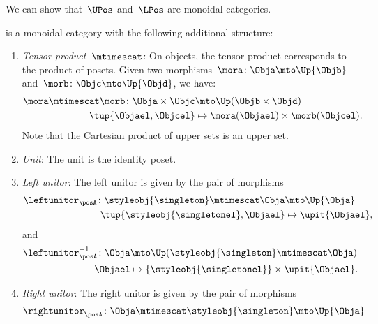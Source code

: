 We can show that~$\UPos$ and~$\LPos$ are monoidal categories.


\begin{lemma}
\label{lem:upos_moncat}
\UPos is a monoidal category with the following additional structure:
\begin{enumerate}
    \item \emph{Tensor product~$\mtimescat$}: On objects, the tensor product corresponds to the product of posets. Given two morphisms~$\mora\colon \Obja\mto \Up{\Objb}$ and~$\morb\colon \Objc\mto \Up{\Objd}$, we have:
    \begin{equation}
    \begin{aligned}
        \mora \mtimescat \morb\colon \Obja \times \Objc &\mto \Up(\Objb\times \Objd)\\
        \tup{\Objael,\Objcel}&\mapsto \mora(\Objael)\times \morb(\Objcel).
    \end{aligned}
    \end{equation}
    Note that the Cartesian product of upper sets is an upper set.
    \item \emph{Unit}: The unit is the identity poset.
    \item \emph{Left unitor}: The left unitor is given by the pair of morphisms
    \begin{equation}
        \begin{aligned}
            \leftunitor_\posA\colon \styleobj{\singleton}\mtimescat \Obja &\mto \Up{\Obja}\\
            \tup{\styleobj{\singletonel},\Objael}&\mapsto \upit\{\Objael\},
        \end{aligned}
    \end{equation}
    and
    \begin{equation}
        \begin{aligned}
            \leftunitor_\posA^{-1}\colon \Obja &\mto \Up(\styleobj{\singleton}\mtimescat \Obja) \\
            \Objael&\mapsto \{\styleobj{\singletonel}\} \times \upit \{\Objael\}.
        \end{aligned}
    \end{equation}
    \item \emph{Right unitor}: The right unitor is given by the pair of morphisms
    \begin{equation}
        \begin{aligned}
            \rightunitor_\posA\colon \Obja\mtimescat \styleobj{\singleton}  &\mto \Up{\Obja}\\

\end{aligned}
\end{equation}
\end{enumerate}
\end{lemma}
